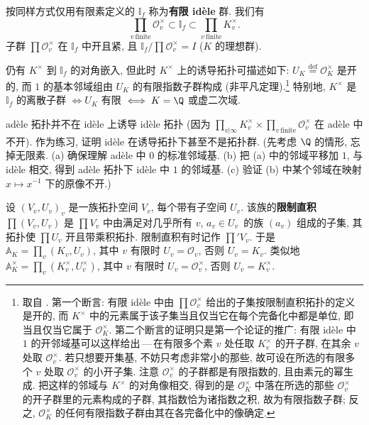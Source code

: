 \setcounter{theorem}{4} %
\begin{aside}\label{asi:v.4.5}
按同样方式仅用有限素定义的 $\mathbb{I}_f$ 称为\textbf{有限 idèle} 群. 我们有
\[
\prod_{v\ \mathrm{finite}}\mathcal{O}_v^{\times}\subset\mathbb{I}_f\subset\prod_{v\ \mathrm{finite}}K_v^{\times}.
\]
子群 $\prod\mathcal{O}_v^{\times}$ 在 $\mathbb{I}_f$ 中开且紧, 且 $\mathbb{I}_f/\prod\mathcal{O}_v^{\times}=I$ ($K$ 的理想群).

仍有 $K^{\times}$ 到 $\mathbb{I}_f$ 的对角嵌入, 但此时 $K^{\times}$ 上的诱导拓扑可描述如下: $U_K\overset{\mathrm{def}}{=}\mathcal{O}_K^{\times}$ 是开的, 而 $1$ 的基本邻域组由 $U_K$ 的有限指数子群构成 (非平凡定理).\footnote{取自 . 第一个断言: 有限 idèle 中由 $\prod\mathcal{O}_v^{\times}$ 给出的子集按限制直积拓扑的定义是开的, 而 $K^{\times}$ 中的元素属于该子集当且仅当它在每个完备化中都是单位, 即当且仅当它属于 $\mathcal{O}_K^{\times}$. 第二个断言的证明只是第一个论证的推广: 有限 idèle 中 $1$ 的开邻域基可以这样给出\,---\,在有限多个素 $v$ 处任取 $K_v^{\times}$ 的开子群, 在其余 $v$ 处取 $\mathcal{O}_v^{\times}$. 若只想要开集基, 不妨只考虑非常小的那些, 故可设在所选的有限多个 $v$ 处取 $\mathcal{O}_v^{\times}$ 的小开子集. 注意 $\mathcal{O}_v^{\times}$ 的子群都是有限指数的, 且由素元的幂生成. 把这样的邻域与 $K^{\times}$ 的对角像相交, 得到的是 $\mathcal{O}_K^{\times}$ 中落在所选的那些 $\mathcal{O}_v^{\times}$ 的开子群里的元素构成的子群, 其指数恰为诸指数之积, 故为有限指数子群; 反之, $\mathcal{O}_K^{\times}$ 的任何有限指数子群由其在各完备化中的像确定.} 特别地, $K^{\times}$ 是 $\mathbb{I}_f$ 的离散子群 $\iff U_K$ 有限 $\iff K=\Q$ 或虚二次域.
\end{aside}

\begin{NOTES}
adèle 拓扑并不在 idèle 上诱导 idèle 拓扑 (因为 $\prod_{v|\infty}K_v^{\times}\times\prod_{v\,\mathrm{finite}}\mathcal{O}_v^{\times}$ 在 adèle 中不开). 作为练习, 证明 idèle 在诱导拓扑下甚至不是拓扑群. (先考虑 $\Q$ 的情形, 忘掉无限素. (a) 确保理解 adèle 中 $0$ 的标准邻域基. (b) 把 (a) 中的邻域平移加 $1$, 与 idèle 相交, 得到 adèle 拓扑下 idèle 中 $1$ 的邻域基. (c) 验证 (b) 中某个邻域在映射 $x\mapsto x^{-1}$ 下的原像不开.)
\end{NOTES}

\begin{NOTES}
设 $(V_v,U_v)_v$ 是一族拓扑空间 $V_v$, 每个带有子空间 $U_v$. 该族的\textbf{限制直积} $\prod(V_v,U_v)$ 是 $\prod V_v$ 中由满足\guillemotleft 对几乎所有 $v$, $a_v\in U_v$\guillemotright\ 的族 $(a_v)$ 组成的子集, 其拓扑使 $\prod U_v$ 开且带乘积拓扑. 限制直积有时记作 $\prod' V_v$. 于是 $\mathbb{A}_K=\prod_v(K_v,U_v)$, 其中 $v$ 有限时 $U_v=\mathcal{O}_v$, 否则 $U_v=K_v$. 类似地 $\mathbb{A}_K^{\times}=\prod_v(K_v^{\times},U_v^{\times})$, 其中 $v$ 有限时 $U_v=\mathcal{O}_v^{\times}$, 否则 $U_v=K_v^{\times}$.
\end{NOTES}

